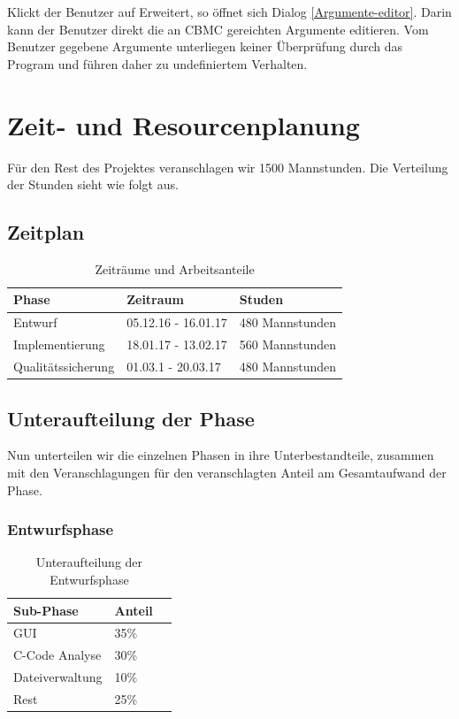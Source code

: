 \documentclass[a4paper]{scrreprt}
\begin{document}
Klickt der \gls{Benutzer} auf Erweitert, so öffnet sich Dialog \ref{Argumente-editor}. Darin kann der \gls{Benutzer} direkt die an \ac{CBMC} gereichten Argumente editieren. Vom \gls{Benutzer} gegebene Argumente unterliegen keiner Überprüfung durch das Program und führen daher zu undefiniertem Verhalten. 

\chapter{Zeit- und Resourcenplanung}

Für den Rest des Projektes veranschlagen wir 1500 Mannstunden. Die Verteilung
der Stunden sieht wie folgt aus.

\section{Zeitplan}

\begin{table}[H]
\centering
  \begin{tabular}{|p{3cm}|P{2cm}|P{2cm}|}
    Phase & Zeitraum & Studen \\ \hline
    Entwurf & 05.12.16 - 16.01.17 & 480 Mannstunden \\ \hline
    Implementierung & 18.01.17 - 13.02.17 & 560 Mannstunden \\ \hline
    Qualitätssicherung & 01.03.1 - 20.03.17 & 480 Mannstunden \\
  \end{tabular}
  \newline\newline
  \caption{Zeiträume und Arbeitsanteile}\label{tab1}
\end{table}


\section{Unteraufteilung der Phase}
Nun unterteilen wir die einzelnen Phasen in ihre Unterbestandteile,
zusammen mit den Veranschlagungen für den veranschlagten Anteil am Gesamtaufwand
der Phase.

\subsection{Entwurfsphase}

\begin{table}[H]
\centering
  \begin{tabular}{|p{3cm}|P{2cm}|P{2cm}|}
    Sub-Phase & Anteil \\ \hline
    GUI & 35\%\\ \hline
    C-Code Analyse & 30\%\\ \hline
    Dateiverwaltung & 10\%\\ \hline
    Rest & 25\%\\
  \end{tabular}
  \newline\newline
  \caption{Unteraufteilung der Entwurfsphase}\label{entw}
\end{table}
\end{document}
